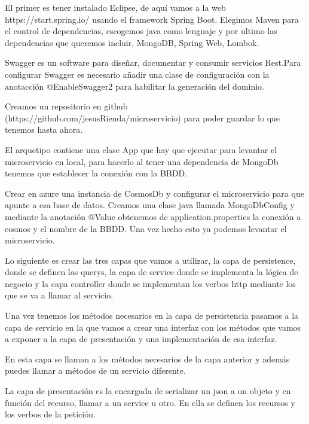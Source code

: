 \documentclass[12pt]{report} %
\begin{document}
El primer es tener instalado Eclipse, de aquí vamos a la web https://start.spring.io/ usando el framework Spring Boot. Elegimos Maven para el control de dependencias, escogemos java como lenguaje y por ultimo las dependencias que queremos incluir, MongoDB, Spring Web, Lombok.

Swagger es un software para diseñar, documentar y consumir servicios Rest.Para configurar Swagger es necesario añadir una clase de configuración con la anotacción @EnableSwagger2 para habilitar la generación del dominio.

Creamos un repositorio en github (https://github.com/jesusRienda/microservicio) para poder guardar lo que tenemos hasta ahora.

El arquetipo contiene una clase App que hay que ejecutar para levantar el microservicio en local, para hacerlo al tener una dependencia de MongoDb tenemos que establecer la conexión con la BBDD.

 Crear en azure una instancia de CosmosDb y configurar el microservicio para que apunte a esa base de datos. Creamos una clase java llamada MongoDbConfig y mediante la anotación @Value obtenemos de application.properties la conexión a cosmos y el nombre de la BBDD. Una vez hecho esto ya podemos levantar el microservicio.

 Lo siguiente es crear las tres capas que vamos a utilizar, la capa de persistence, donde se definen las querys, la capa de service donde se implementa la lógica de negocio y la capa controller donde se implementan los verbos http mediante los que se va a llamar al servicio.
 
 Una vez tenemos los métodos necesarios en la capa de persistencia pasamos a la capa de servicio en la que vamos a crear una interfaz con los métodos que vamos a exponer a la capa de presentación y una implementación de esa interfaz. 
 
 En esta capa se llaman a los métodos necesarios de la capa anterior y además puedes llamar a métodos de un servicio diferente.
 
 La capa de presentación es la encargada de serializar un json a un objeto y en función del recurso, llamar a un service u otro. En ella se definen los recursos y los verbos de la petición. 
 






\clearpage
{}
\printbibliography




\end{document}
